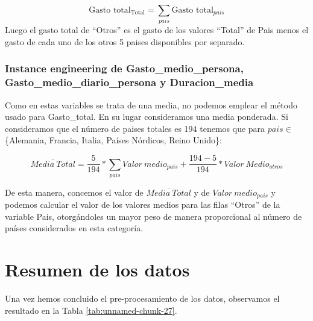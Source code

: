 \documentclass[data,article,submit,moreauthors,pdftex]{Definitions/mdpi}
\begin{document}
\[ \text{Gasto total}_{\text{Total}} = \sum_{pais}{\text{Gasto total}_{pais}}\]
Luego el gasto total de ``Otros'' es el gasto de los valores ``Total''
de Pais menos el gasto de cada uno de los otros 5 paises disponibles por
separado.

\hypertarget{instance-engineering-de-gasto_medio_persona-gasto_medio_diario_persona-y-duracion_media}{%
\subsubsection{Instance engineering de Gasto\_medio\_persona,
Gasto\_medio\_diario\_persona y
Duracion\_media}\label{instance-engineering-de-gasto_medio_persona-gasto_medio_diario_persona-y-duracion_media}}

Como en estas variables se trata de una media, no podemos emplear el
método usado para Gasto\_total. En su lugar consideramos una media
ponderada. Si consideramos que el número de paises totales es 194
tenemos que para \(pais \in\) \{Alemania, Francia, Italia, Países
Nórdicos, Reino Unido\}:

\[
 \overline{Media\ Total} = \frac{5}{194}*\sum_{pais}{Valor\ medio}_{pais} + \frac{194-5}{194}*Valor \ Medio_{otros}
\]

De esta manera, concemos el valor de \(\overline{Media\ Total}\) y de
\({Valor\ medio}_{pais}\) y podemos calcular el valor de los valores
medios para las filas ``Otros'' de la variable Pais, otorgándoles un
mayor peso de manera proporcional al número de países considerados en
esta categoría.

\hypertarget{resumen-de-los-datos}{%
\section{Resumen de los datos}\label{resumen-de-los-datos}}

Una vez hemos concluido el pre-procesamiento de los datos, observamos el
resultado en la Tabla \ref{tab:unnamed-chunk-27}.
\end{document}
